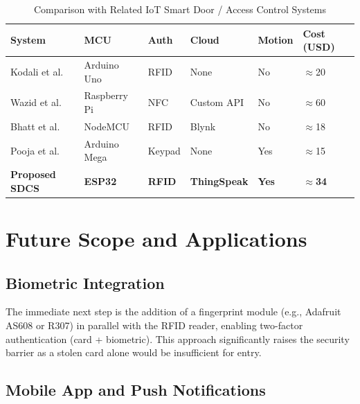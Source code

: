 \documentclass[12pt,a4paper]{article}
\begin{document}
\begin{table}[!ht]
\centering
\caption{Comparison with Related IoT Smart Door / Access Control Systems}
\label{tab:comparison}
\renewcommand{\arraystretch}{1.3}
\begin{tabularx}{\textwidth}{L{3.2cm} C{1.5cm} C{1.2cm} C{3.2cm} C{2.5cm} X}
\toprule
\textbf{System} & \textbf{MCU} & \textbf{Auth} &
\textbf{Cloud} & \textbf{Motion} & \textbf{Cost (USD)} \\
\midrule
{}
Kodali et al.~\cite{kodali2016}      & Arduino Uno  & RFID   & None       & No  & $\approx$20 \\
Wazid et al.~\cite{wazid2019}        & Raspberry Pi & NFC    & Custom API & No  & $\approx$60 \\
Bhatt et al.~\cite{bhatt2017}        & NodeMCU      & RFID   & Blynk      & No  & $\approx$18 \\
Pooja et al.~\cite{pooja2020}        & Arduino Mega & Keypad & None       & Yes & $\approx$15 \\
\textbf{Proposed SDCS}              & \textbf{ESP32} & \textbf{RFID} & \textbf{ThingSpeak} & \textbf{Yes} & $\approx$\textbf{34} \\
\bottomrule
\end{tabularx}
\end{table}

\section{Future Scope and Applications}
\label{sec:future}

\subsection{Biometric Integration}

The immediate next step is the addition of a fingerprint module
(e.g., Adafruit AS608 or R307) in parallel with the RFID reader,
enabling two-factor authentication (card + biometric). This approach
significantly raises the security barrier as a stolen card alone
would be insufficient for entry.

\subsection{Mobile App and Push Notifications}
\end{document}

